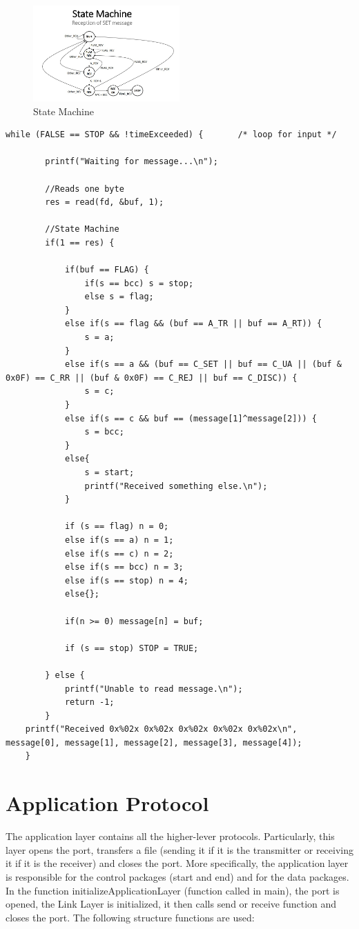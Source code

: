 \documentclass[a4paper]{article}
\begin{document}
\begin{figure}[h!]
	\centering
	\includegraphics[width=0.5\textwidth]{statemachine.jpg}
	\caption{State Machine}
	\label{Image: State Machine}
\end{figure}

\begin{lstlisting}
while (FALSE == STOP && !timeExceeded) {       /* loop for input */

		printf("Waiting for message...\n");
		
		//Reads one byte
		res = read(fd, &buf, 1);
		
		//State Machine
		if(1 == res) {
			
			if(buf == FLAG) {
				if(s == bcc) s = stop;
				else s = flag; 
			}
			else if(s == flag && (buf == A_TR || buf == A_RT)) {
				s = a;
			}
			else if(s == a && (buf == C_SET || buf == C_UA || (buf & 0x0F) == C_RR || (buf & 0x0F) == C_REJ || buf == C_DISC)) {
				s = c;
			}
			else if(s == c && buf == (message[1]^message[2])) {
				s = bcc;
			}
			else{
				s = start;
				printf("Received something else.\n");
			}

			if (s == flag) n = 0;
			else if(s == a) n = 1;
			else if(s == c) n = 2;
			else if(s == bcc) n = 3;
			else if(s == stop) n = 4;
			else{};

			if(n >= 0) message[n] = buf;

			if (s == stop) STOP = TRUE;
			
		} else {
			printf("Unable to read message.\n");
			return -1;
		}
	printf("Received 0x%02x 0x%02x 0x%02x 0x%02x 0x%02x\n", message[0], message[1], message[2], message[3], message[4]);	
	}
\end{lstlisting}


\section{Application Protocol}

The application layer contains all the higher-lever protocols. Particularly, this layer opens the port, transfers a file (sending it if it is the transmitter or receiving it if it is the receiver) and closes the port. More specifically, the application layer is responsible for the control packages (start and end) and for the data packages. In the function initializeApplicationLayer (function called in main), the port is opened, the Link Layer is initialized, it then calls send or receive function and closes the port. The following structure functions are used:
\end{document}
